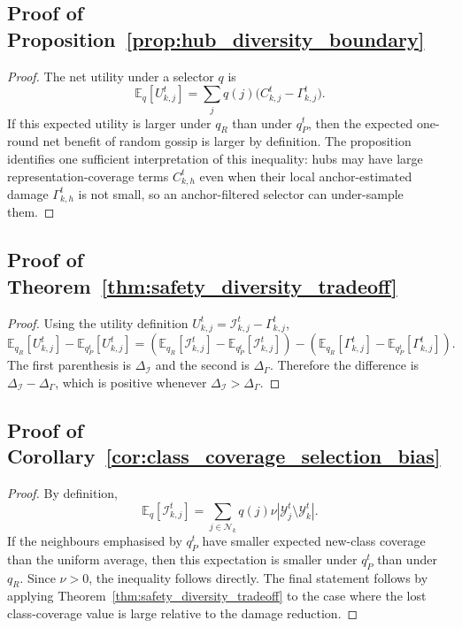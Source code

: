 \documentclass[conference]{IEEEtran}
\begin{document}
\subsection{Proof of Proposition~\ref{prop:hub_diversity_boundary}}
\begin{proof}
The net utility under a selector \(q\) is
\[
\mathbb{E}_{q}[U_{k,j}^t]
=
\sum_j q(j)\big(C_{k,j}^t-\Gamma_{k,j}^t\big).
\]
If this expected utility is larger under \(q_R\) than under \(q_P^t\), then the expected one-round net benefit of random gossip is larger by definition. The proposition identifies one sufficient interpretation of this inequality: hubs may have large representation-coverage terms \(C_{k,h}^t\) even when their local anchor-estimated damage \(\Gamma_{k,h}^t\) is not small, so an anchor-filtered selector can under-sample them.
\end{proof}

\subsection{Proof of Theorem~\ref{thm:safety_diversity_tradeoff}}
\begin{proof}
Using the utility definition \(U_{k,j}^t=\mathcal{I}_{k,j}^t-\Gamma_{k,j}^t\),
\[
\mathbb{E}_{q_R}[U_{k,j}^t]
-
\mathbb{E}_{q_P^t}[U_{k,j}^t]
=
\left(
\mathbb{E}_{q_R}[\mathcal{I}_{k,j}^t]
-
\mathbb{E}_{q_P^t}[\mathcal{I}_{k,j}^t]
\right)
-
\left(
\mathbb{E}_{q_R}[\Gamma_{k,j}^t]
-
\mathbb{E}_{q_P^t}[\Gamma_{k,j}^t]
\right).
\]
The first parenthesis is \(\Delta_{\mathcal{I}}\) and the second is \(\Delta_{\Gamma}\). Therefore the difference is \(\Delta_{\mathcal{I}}-\Delta_{\Gamma}\), which is positive whenever \(\Delta_{\mathcal{I}}>\Delta_{\Gamma}\).
\end{proof}

\subsection{Proof of Corollary~\ref{cor:class_coverage_selection_bias}}
\begin{proof}
By definition,
\[
\mathbb{E}_{q}[\mathcal{I}_{k,j}^t]
=
\sum_{j\in\mathcal{N}_k}
q(j)\nu|\mathcal{Y}_j^t\setminus\mathcal{Y}_k^t|.
\]
If the neighbours emphasised by \(q_P^t\) have smaller expected new-class coverage than the uniform average, then this expectation is smaller under \(q_P^t\) than under \(q_R\). Since \(\nu>0\), the inequality follows directly. The final statement follows by applying Theorem~\ref{thm:safety_diversity_tradeoff} to the case where the lost class-coverage value is large relative to the damage reduction.
\end{proof}
\end{document}
